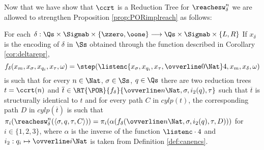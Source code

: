 \begin{conditional}{\notappendix}
    Now that we have show that $\ccrt$ is a Reduction Tree for $\reachesw^n_\delta$
    we are allowed to strengthen Proposition \ref{prop:PORimplreach} as follows:

    \begin{prop}
      \label{prop:PORimplreach2}
      For each $\delta: \Qs \times \Sigmab \times \{\zzero, \oone\} \longrightarrow \Qs \times \Sigmab \times \{L,R\}$
      If $x_\delta$ is the encoding of $\delta$ in $\Ss$ obtained through
      the function described in Corollary \ref{cor:deltarepr},
      \[
      f_\delta(x_m, x_\sigma, x_{q_i}, x_\tau,\omega) =
      \step(\listenc {x_\sigma, x_{q_i}, x_\tau, \ovverline 0 \Nat} 4, x_m,
      x_\delta, \omega)
      \]
      is such that for every $n \in \Nat$,  $\sigma \in \Ss$, $q \in \Qs$
      there are two reduction trees\linebreak
      $t =\ccrt(n)$ and
      $\overline t \in \RT{\POR} {f_\delta} {\ovverline n \Nat,\sigma, i_2(q), \tau}$
      such that $\overline t$ is structurally identical to $t$ and
      for every path $C$ in $\mathit{cylp}(t)$,
      the corresponding path $D$ in $\mathit{cylp}(\overline t)$ is such that
      $\pi_i(\reachesw^n_\delta(\langle \sigma, q, \tau, C\rangle)) = \pi_i(\alpha
      (f_\delta(\ovverline n\Nat,\sigma, i_2(q), \tau, D)))$ for $i \in\{1,2,3\}$,
      where $\alpha$ is the inverse of the function $\listenc \cdot 4$ and
      $i_2: q_i \mapsto \ovverline i \Nat$
      is taken from Definition \ref{def:canencs}.
    \end{prop}



\end{conditional}
